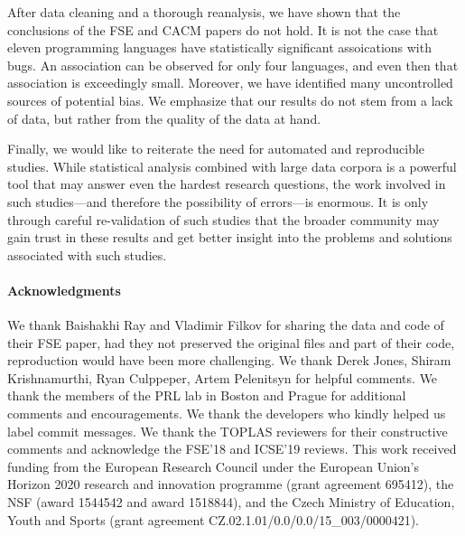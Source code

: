 \documentclass[acmsmall]{acmart}
\begin{document}
After data cleaning and a thorough reanalysis, we have shown that the
conclusions of the FSE and CACM papers do not hold. It is not the case that
eleven programming languages have statistically significant assoications
with bugs. An association can be observed for only four languages, and even
then that association is exceedingly small. Moreover, we have identified
many uncontrolled sources of potential bias.  We emphasize that our results
do not stem from a lack of data, but rather from the quality of the data at
hand.

Finally, we would like to reiterate the need for automated and reproducible
studies. While statistical analysis combined with large data corpora is
a powerful tool that may answer even the hardest research questions, the
work involved in such studies---and therefore the possibility of errors---is
enormous. It is only through careful re-validation of such studies that
the broader community may gain trust in these results and get better insight
into the problems and solutions associated with such studies. 

\paragraph{Acknowledgments} 
We thank Baishakhi Ray and Vladimir Filkov for sharing the data and code of
their FSE paper, had they not preserved the original files and part of their
code, reproduction would have been more challenging.  We thank Derek Jones,
Shiram Krishnamurthi, Ryan Culppeper, Artem Pelenitsyn for helpful comments.
We thank the members of the PRL lab in Boston and Prague for additional
comments and encouragements. We thank the developers who kindly helped us
label commit messages.  We thank the TOPLAS reviewers for their constructive
comments and acknowledge the FSE'18 and ICSE'19 reviews.  This work received
funding from the European Research Council under the European Union's
Horizon 2020 research and innovation programme (grant agreement 695412), the
NSF (award 1544542 and award 1518844), and the Czech Ministry of Education,
Youth and Sports (grant agreement CZ.02.1.01/0.0/0.0/15\_003/0000421).
                                                   

\end{document}
